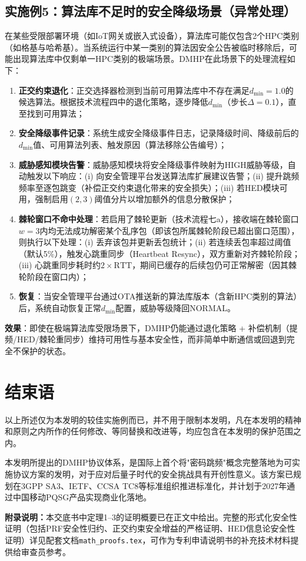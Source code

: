 ﻿\documentclass[12pt,a4paper]{article}
\begin{document}
\subsection{实施例5：算法库不足时的安全降级场景（异常处理）}

在某些受限部署环境（如IoT网关或嵌入式设备），算法库可能仅包含2个HPC类别（如格基与哈希基）。当系统运行中某一类别的算法因安全公告被临时移除后，可能出现算法库中仅剩单一HPC类别的极端场景。DMHP在此场景下的处理流程如下：

\begin{enumerate}[label=\textbf{步骤\arabic*}：]
    \item \textbf{正交约束退化}：正交选择器检测到当前可用算法库中不存在满足$d_{\min}=1.0$的候选算法。根据技术流程四中的退化策略，逐步降低$d_{\min}$（步长$\Delta=0.1$），直至找到可用算法；
    \item \textbf{安全降级事件记录}：系统生成安全降级事件日志，记录降级时间、降级前后的$d_{\min}$值、可用算法列表、触发原因（算法移除公告编号）；
    \item \textbf{威胁感知模块告警}：威胁感知模块将安全降级事件映射为HIGH威胁等级，自动触发以下响应：(i) 向安全管理平台发送算法库扩展建议告警；(ii) 提升跳频频率至逐包跳变（补偿正交约束退化带来的安全损失）；(iii) 若HED模块可用，强制启用$(2,3)$阈值分片以增加额外的信息分散保护；
    \item \textbf{棘轮窗口不命中处理}：若启用了棘轮更新（技术流程七a），接收端在棘轮窗口$w=3$内均无法成功解密某个乱序包（即该包所属棘轮阶段已超出窗口范围），则执行以下处理：(i) 丢弃该包并更新丢包统计；(ii) 若连续丢包率超过阈值（默认5\%），触发心跳重同步（Heartbeat Resync），双方重新对齐棘轮阶段；(iii) 心跳重同步耗时约$2\times\text{RTT}$，期间已缓存的后续包仍可正常解密（因其棘轮阶段在窗口内）；
    \item \textbf{恢复}：当安全管理平台通过OTA推送新的算法库版本（含新HPC类别的算法）后，系统自动恢复正常$d_{\min}$配置，威胁等级降回NORMAL。
\end{enumerate}

\textbf{效果}：即使在极端算法库受限场景下，DMHP仍能通过退化策略 + 补偿机制（提频/HED/棘轮重同步）维持可用性与基本安全性，而非简单中断通信或回退到完全不保护的状态。

\section{结束语}

以上所述仅为本发明的较佳实施例而已，并不用于限制本发明，凡在本发明的精神和原则之内所作的任何修改、等同替换和改进等，均应包含在本发明的保护范围之内。

本发明所提出的DMHP协议体系，是国际上首个将"密码跳频"概念完整落地为可实施协议方案的发明，对于应对后量子时代的安全挑战具有开创性意义。该方案已规划在3GPP SA3、IETF、CCSA TC8等标准组织推进标准化，并计划于2027年通过中国移动PQSG产品实现商业化落地。

\textbf{附录说明：}本交底书中定理1--3的证明概要已在正文中给出。完整的形式化安全性证明（包括PRF安全性归约、正交约束安全增益的严格证明、HED信息论安全性证明）详见配套文档\texttt{math\_proofs.tex}，可作为专利申请说明书的补充技术材料提供给审查员参考。
\end{document}
